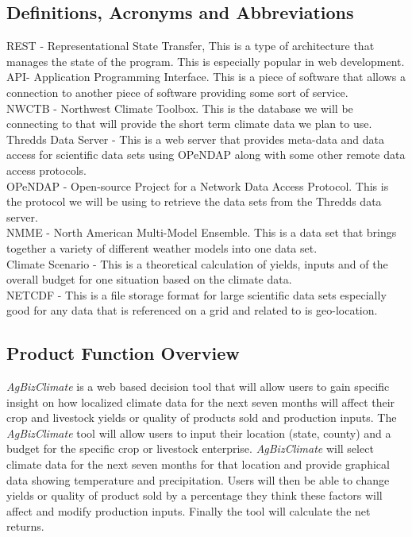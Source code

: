 \documentclass[onecolumn, draftclsnofoot,10pt, compsoc]{article}
\begin{document}
		\subsection{Definitions, Acronyms and Abbreviations}
			REST - Representational State Transfer, This is a type of architecture that manages the state of the program. This is especially popular in web development.\\
			API- Application Programming Interface. This is a piece of software that allows a connection to another piece of software providing some sort of service.\\
			NWCTB - Northwest Climate Toolbox. This is the database we will be connecting to that will provide the short term climate data we plan to use.\\
			Thredds Data Server - This is a web server that provides meta-data and data access for scientific data sets using OPeNDAP along with some other remote data access protocols.\\
			OPeNDAP - Open-source Project for a Network Data Access Protocol. This is the protocol we will be using to retrieve the data sets from the Thredds data server.\\
			NMME - North American Multi-Model Ensemble. This is a data set that brings together a variety of different weather models into one data set.\\
			Climate Scenario - This is a theoretical calculation of yields, inputs and of the overall budget for one situation based on the climate data.\\
			NETCDF - This is a file storage format for large scientific data sets especially good for any data that is referenced on a grid and related to is geo-location.\\


		\subsection{Product Function Overview}
		    \textit{AgBizClimate} is a web based decision tool that will allow users to gain specific insight on how localized climate data for the next seven months will affect their crop and livestock yields or quality of products sold and production inputs. The \textit{AgBizClimate} tool will allow users to input their location (state, county) and a budget for the specific crop or livestock enterprise. \textit{AgBizClimate} will select climate data for the next seven months for that location and provide graphical data showing temperature and precipitation. Users will then be able to change yields or quality of product sold by a percentage they think these factors will affect and modify production inputs. Finally the tool will calculate the net returns.\\
\end{document}
